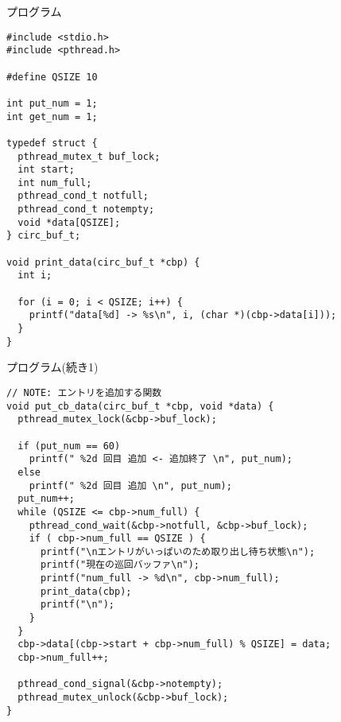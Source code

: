 \documentclass[10pt]{jarticle}
\begin{document}
\begin{itembox}[l]{プログラム}
  \begin{verbatim}
#include <stdio.h>
#include <pthread.h>

#define QSIZE 10

int put_num = 1;
int get_num = 1;

typedef struct {
  pthread_mutex_t buf_lock;
  int start;
  int num_full;
  pthread_cond_t notfull;
  pthread_cond_t notempty;
  void *data[QSIZE];
} circ_buf_t;

void print_data(circ_buf_t *cbp) {
  int i;

  for (i = 0; i < QSIZE; i++) {
    printf("data[%d] -> %s\n", i, (char *)(cbp->data[i]));
  }
}
  \end{verbatim}
\end{itembox}

\begin{itembox}[l]{プログラム(続き1)}
  \begin{verbatim}
// NOTE: エントリを追加する関数
void put_cb_data(circ_buf_t *cbp, void *data) {
  pthread_mutex_lock(&cbp->buf_lock);

  if (put_num == 60)
    printf(" %2d 回目 追加 <- 追加終了 \n", put_num);
  else
    printf(" %2d 回目 追加 \n", put_num);
  put_num++;
  while (QSIZE <= cbp->num_full) {
    pthread_cond_wait(&cbp->notfull, &cbp->buf_lock);
    if ( cbp->num_full == QSIZE ) {
      printf("\nエントリがいっぱいのため取り出し待ち状態\n");
      printf("現在の巡回バッファ\n");
      printf("num_full -> %d\n", cbp->num_full);
      print_data(cbp);
      printf("\n");
    }
  }
  cbp->data[(cbp->start + cbp->num_full) % QSIZE] = data;
  cbp->num_full++;

  pthread_cond_signal(&cbp->notempty);
  pthread_mutex_unlock(&cbp->buf_lock);
}
  \end{verbatim}
\end{itembox}
\end{document}
